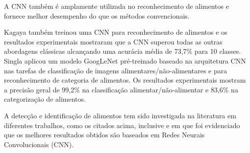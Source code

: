 A CNN também é amplamente utilizada no reconhecimento de alimentos e fornece melhor desempenho do que os métodos convencionais. 

Kagaya \cite{kagaya2014food} também treinou uma CNN para reconhecimento de alimentos e os resultados experimentais mostraram que a CNN superou todas as outras abordagens clássicas alcançando uma acurácia média de 73,7\% para 10 classes. Singla \cite{singla2016food} aplicou um modelo GoogLeNet pré-treinado baseado na arquitetura CNN nas tarefas de classificação de imagens alimentares/não-alimentares e para reconhecimento de categoria de alimentos. Os resultados experimentais mostram a precisão geral de 99,2\% na classificação alimentar/não-alimentar e 83,6\% na categorização de alimentos. 

A detecção e identificação de alimentos tem sido investigada na literatura em diferentes trabalhos, como os citados acima, inclusive \cite{aguilar2017food} e \cite{pouladzadeh2017cloud} em que foi evidenciado que os melhores resultados obtidos são baseados em Redes Neurais Convolucionais (CNN).



